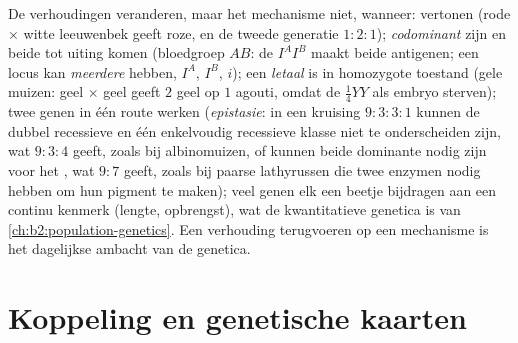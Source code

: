 \begin{proposition}\label{prop:b2:meiosis-heredity:extensions}
De verhoudingen veranderen, maar het mechanisme niet, wanneer: 
\emph{} vertonen (rode $\times$ witte leeuwenbek
geeft roze, en de tweede generatie $1 : 2 : 1$); 
\emph{codominant} zijn en beide tot uiting komen (bloedgroep $AB$: de
 $I^AI^B$ maakt beide antigenen; een locus kan \emph{meerdere
} hebben, $I^A$, $I^B$, $i$); een  \emph{letaal} is in
homozygote toestand (gele muizen: geel $\times$ geel geeft $2$ geel op
$1$ agouti, omdat de $\tfrac14 YY$ als embryo sterven); twee genen in
één route werken (\emph{epistasie}: in een kruising $9 : 3 : 3 : 1$
kunnen de dubbel recessieve en één enkelvoudig recessieve klasse niet te
onderscheiden zijn, wat
$9 : 3 : 4$ geeft, zoals bij albinomuizen, of kunnen beide dominante
 nodig zijn voor het , wat $9 : 7$ geeft, zoals bij paarse
lathyrussen die twee enzymen nodig hebben om hun pigment te maken); veel
genen elk een beetje bijdragen aan een continu kenmerk (lengte,
opbrengst), wat de kwantitatieve genetica is van
\cref{ch:b2:population-genetics}. Een verhouding terugvoeren op een
mechanisme is het dagelijkse ambacht van de genetica.
\end{proposition}

\section{Koppeling en genetische kaarten}

